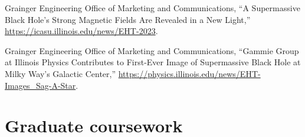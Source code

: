 \documentclass[11pt]{article}
\begin{document}
Grainger Engineering Office of Marketing and Communications, “A Supermassive Black Hole’s Strong Magnetic Fields Are Revealed in a New Light,” \href{https://icasu.illinois.edu/news/EHT-2023}{https://icasu.illinois.edu/news/EHT-2023}.

Grainger Engineering Office of Marketing and Communications, “Gammie Group at Illinois Physics Contributes to First-Ever Image of Supermassive Black Hole at Milky Way’s Galactic Center,” \href{https://physics.illinois.edu/news/EHT-Images\_Sag-A-Star}{https://physics.illinois.edu/news/EHT-Images\_Sag-A-Star}.

\else\fi

\ifdefined\withcourses{}
\section*{Graduate coursework}

\else\fi
\end{document}
